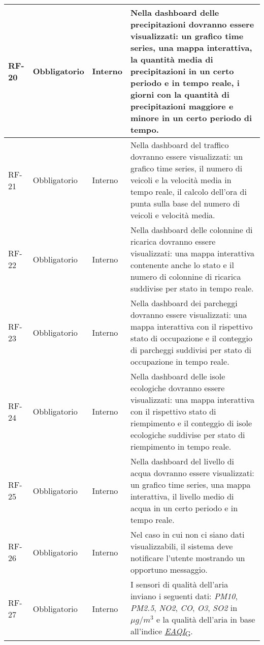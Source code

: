 \begin{longtable}{|>{\centering\arraybackslash}m{}|>{\centering\arraybackslash}m{}|>{\centering\arraybackslash}m{}|>{\centering\arraybackslash}m{}|}
	RF-20           & Obbligatorio        & Interno        & Nella dashboard delle precipitazioni dovranno essere visualizzati: un grafico time series, una mappa interattiva, la quantità media di precipitazioni in un certo periodo e in tempo reale, i giorni con la quantità di precipitazioni maggiore e minore in un certo periodo di tempo.
	\\\hline
	RF-21           & Obbligatorio        & Interno        & Nella dashboard del traffico dovranno essere visualizzati: un grafico time series, il numero di veicoli e la velocità media in tempo reale, il calcolo dell'ora di punta sulla base del numero di veicoli e velocità media.
	\\\hline
	RF-22           & Obbligatorio        & Interno        & Nella dashboard delle colonnine di ricarica dovranno essere visualizzati: una mappa interattiva contenente anche lo stato e il numero di colonnine di ricarica suddivise per stato in tempo reale.
	\\\hline
	RF-23           & Obbligatorio        & Interno        & Nella dashboard dei parcheggi dovranno essere visualizzati: una mappa interattiva con il rispettivo stato di occupazione e il conteggio di parcheggi suddivisi per stato di occupazione in tempo reale.
	\\\hline
	RF-24           & Obbligatorio        & Interno        & Nella dashboard delle isole ecologiche dovranno essere visualizzati: una mappa interattiva con il rispettivo stato di riempimento e il conteggio di isole ecologiche suddivise per stato di riempimento in tempo reale.
	\\\hline
	RF-25           & Obbligatorio        & Interno        & Nella dashboard del livello di acqua dovranno essere visualizzati: un grafico time series, una mappa interattiva, il livello medio di acqua in un certo periodo e in tempo reale.
	\\\hline
	RF-26           & Obbligatorio        & Interno        & Nel caso in cui non ci siano dati visualizzabili, il sistema deve notificare l'utente mostrando un opportuno messaggio.
	\\\hline
	RF-27           & Obbligatorio        & Interno        & I sensori di qualità dell'aria inviano i seguenti dati: \textit{PM10}, \textit{PM2.5}, \textit{NO2}, \textit{CO}, \textit{O3}, \textit{SO2} in $\mu g/m^3$ e la qualità dell'aria in base all'indice \href{https://7last.github.io/docs/rtb/documentazione-interna/glossario\#european-air-quality-index}{\textit{EAQI}\textsubscript{G}}.                                       \\\hline

\end{longtable}
